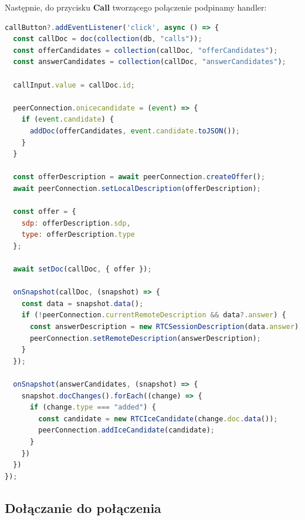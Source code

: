 Następnie, do przycisku \textbf{Call} tworzącego połączenie podpinamy handler:

\begin{lstlisting}[language=Javascript,label=list:call-create, caption=Tworzenie połączenia,
basicstyle=\footnotesize \ttfamily, showtabs=true, tabsize=4]
callButton?.addEventListener('click', async () => {
  const callDoc = doc(collection(db, "calls"));
  const offerCandidates = collection(callDoc, "offerCandidates");
  const answerCandidates = collection(callDoc, "answerCandidates");

  callInput.value = callDoc.id;

  peerConnection.onicecandidate = (event) => {
    if (event.candidate) {
      addDoc(offerCandidates, event.candidate.toJSON());
    }
  }

  const offerDescription = await peerConnection.createOffer();
  await peerConnection.setLocalDescription(offerDescription);

  const offer = {
    sdp: offerDescription.sdp,
    type: offerDescription.type
  };

  await setDoc(callDoc, { offer });

  onSnapshot(callDoc, (snapshot) => {
    const data = snapshot.data();
    if (!peerConnection.currentRemoteDescription && data?.answer) {
      const answerDescription = new RTCSessionDescription(data.answer);
      peerConnection.setRemoteDescription(answerDescription);
    }
  });

  onSnapshot(answerCandidates, (snapshot) => {
    snapshot.docChanges().forEach((change) => {
      if (change.type === "added") {
        const candidate = new RTCIceCandidate(change.doc.data());
        peerConnection.addIceCandidate(candidate);
      }
    })
  })
});
\end{lstlisting}

\subsection{Dołączanie do połączenia}

